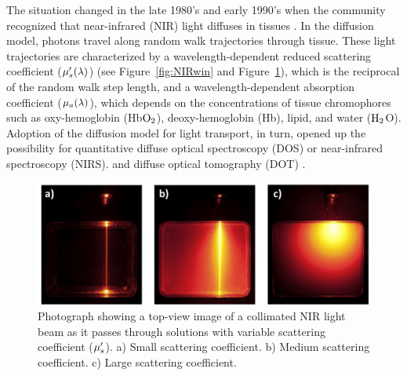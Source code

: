 The situation changed in the late 1980's and early 1990's when the community recognized that near-infrared (NIR) light diffuses in tissues \cite{Ishimaru1978,Rossum1999,Case1967}. In the diffusion model, photons travel along random walk trajectories through tissue. These light trajectories are characterized by a wavelength-dependent reduced scattering coefficient ($\mu_s^{\prime}(\lambda)$) (see Figure~\ref{fig:NIRwin} and Figure~\ref{fig:diffusephoto}), which is the reciprocal of the random walk step length, and a wavelength-dependent absorption coefficient ($\mu_a(\lambda)$), which depends on the concentrations of tissue chromophores such as oxy-hemoglobin (Hb$\rm{O_2}$), deoxy-hemoglobin (Hb), lipid, and water ($\rm{H_2}$O). Adoption of the diffusion model for light transport, in turn, opened up the possibility for quantitative diffuse optical spectroscopy (DOS) or near-infrared spectroscopy (NIRS). \cite{Boas1994,OLeary1996,McBride1999,Shah2001,Ntziachristos2002,Boas2002,Lin2002,Culver2003a,Cuccia2003,Yu2003,Merritt2003,Boas2004,Durduran2004,Shah2004,Jakubowski2004,Shah2005,Cerussi2006,Bassi2007,Cerussi2007,Xu2007,Franceschini2007,Zaman2007,Chung2008,Tseng2008,Jiang2009} and diffuse optical tomography (DOT) \cite{OLeary1995,Arridge1998a,Arridge1999,Siegel1999,Colak1999,Ntziachristos2000,Hawrysz2000,McBride2001,Pogue2001,Ntziachristos2002,Durduran2002,Intes2003,Culver2003,Corlu2003,Durduran2005,Choe2005a,Yates2005,Corlu2007,Lasker2007,Yalavarthy2007,Konecky2008a,Choe2009,Durduran2010,Flexman2011}. 
\begin{figure}[t]
\centering
\includegraphics[width=14.5cm]{./figures/1_Introduction/diffusephoto.png}
\caption[Photo of light in varied scattering media]{Photograph showing a top-view image of a collimated NIR light beam as it passes through solutions with variable scattering coefficient ($\mu_s^{\prime}$). a) Small scattering coefficient. b) Medium scattering coefficient. c) Large scattering coefficient.}
\label{fig:diffusephoto}
\end{figure}

